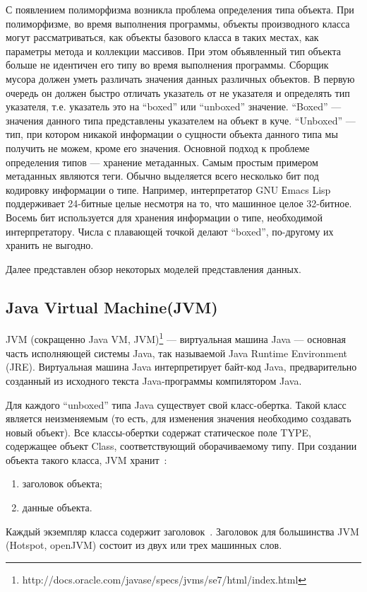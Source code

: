 \documentclass[12pt,a4paper]{article}
\begin{document}
С появлением полиморфизма возникла проблема определения типа объекта. При полиморфизме, во время выполнения программы,
объекты производного класса могут рассматриваться,
как объекты базового класса в таких местах, как параметры метода и коллекции
массивов. При этом объявленный тип объекта больше не идентичен его типу во время выполнения программы.
Сборщик мусора должен уметь различать значения данных различных объектов.
В первую очередь он должен быстро отличать указатель от не указателя и определять тип указателя,
т.е. указатель это на ``boxed''  или ``unboxed''  значение.
``Boxed'' — значения данного типа представлены указателем на объект в куче. 
``Unboxed''  — тип, при котором никакой информации о сущности объекта данного типа мы получить не можем, кроме его значения.
Основной подход к проблеме определения типов — хранение метаданных.
Самым простым примером метаданных являются теги.
Обычно выделяется всего несколько бит под кодировку информации о типе.
Например, интерпретатор
GNU Еmacs Lisp поддерживает 24-битные целые несмотря на то,
что машинное целое 32-битное.
Восемь бит используется для хранения информации о типе, необходимой интерпретатору.
Числа с плавающей точкой делают ``boxed'', по-другому их хранить не выгодно.

Далее представлен обзор некоторых моделей представления данных.

\subsection {Java Virtual Machine(JVM)}
JVM (сокращенно Java VM, JVM)\footnote{http://docs.oracle.com/javase/specs/jvms/se7/html/index.html} —
виртуальная машина Java 
— основная часть исполняющей системы Java,
так называемой Java Runtime Environment (JRE).
Виртуальная машина Java интерпретирует байт-код Java,
предварительно созданный из исходного текста Java-программы
компилятором Java.

Для каждого ``unboxed'' типа Java существует свой класс-обертка.
Такой класс является неизменяемым (то есть, для
изменения значения необходимо создавать новый объект).
Все классы-обертки содержат статическое поле TYPE, содержащее объект
Class, соответствующий оборачиваемому типу.
При создании объекта такого класса, JVM хранит~\cite{java1}:
\begin{enumerate}
\item[1)]заголовок объекта;
\item[2)]данные объекта.
\end{enumerate}
Каждый экземпляр класса содержит заголовок~\cite{java2}. Заголовок для 
большинства JVM (Hotspot, openJVM) состоит из двух или трех машинных слов.
\end{document}
